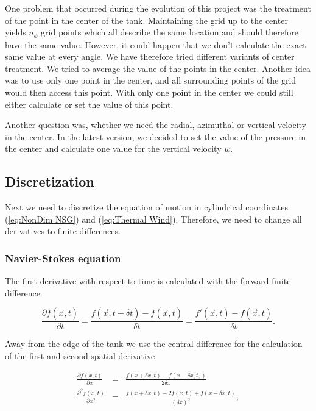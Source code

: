 \documentclass[12pt, a4paper]{article} %
\begin{document}
		One problem that occurred during the evolution of this project was the treatment of the point in the center of the tank. Maintaining the grid up to the center yields $n_\phi$ grid points which all describe the same location and should therefore have the same value. However, it could happen that we don't calculate the exact same value at every angle. We have therefore tried different variants of center treatment. We tried to average the value of the points in the center. Another idea was to use only one point in the center, and all surrounding points of the grid would then access this point. With only one point in the center we could still either calculate or set the value of this point.
		
		Another question was, whether we need the radial, azimuthal or vertical velocity in the center. In the latest version, we decided to set the value of the pressure in the center and calculate one value for the vertical velocity $w$. 
		
	\subsection{Discretization} %
		Next we need to discretize the equation of motion in cylindrical coordinates (\ref{eq:NonDim NSG}) and (\ref{eq:Thermal Wind}). Therefore, we need to change all derivatives to finite differences. 
		
		\subsubsection{Navier-Stokes equation}
			The first derivative with respect to time is calculated with the forward finite difference
			
			\begin{equation}
				\frac{\partial f(\vec{x}, t)}{\partial t} = \frac{f(\vec{x},t+\delta t) - f(\vec{x}, t)}{\delta t} = \frac{f'(\vec{x},t) - f(\vec{x}, t)}{\delta t} .
				\label{eq:ForwDiv Time}
			\end{equation}
			
			Away from the edge of the tank we use the central difference for the calculation of the first and second spatial derivative %
			
			\begin{eqnarray}
				\frac{\partial f(x,t)}{\partial x} &=& \frac{f(x + \delta x,t) - f(x - \delta x,t,)}{2\delta x}
				\label{eq:CentrDiv Space}
				\\
				\frac{\partial^2 f(x,t)}{\partial x^2} &=& \frac{f(x+\delta x,t) - 2f(x,t) + f(x - \delta x,t)}{\left(\delta x\right)^2} ,
				\label{eq:2CentrDiv Space}
			\end{eqnarray}
			
\end{document}

